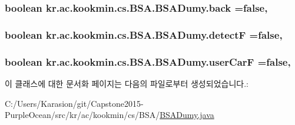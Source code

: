 \subsubsection[{back}]{\setlength{\rightskip}{0pt plus 5cm}boolean kr.\+ac.\+kookmin.\+cs.\+B\+S\+A.\+B\+S\+A\+Dumy.\+back =false\hspace{0.3cm}{\ttfamily [static]}, {\ttfamily [private]}}\label{classkr_1_1ac_1_1kookmin_1_1cs_1_1_b_s_a_1_1_b_s_a_dumy_a83dfdbc6e79d76f3fb82f19e88526aea}
\hypertarget{classkr_1_1ac_1_1kookmin_1_1cs_1_1_b_s_a_1_1_b_s_a_dumy_a96b15a50850eb2c92dbb11ee225ff1ef}{}
\subsubsection[{detect\+F}]{\setlength{\rightskip}{0pt plus 5cm}boolean kr.\+ac.\+kookmin.\+cs.\+B\+S\+A.\+B\+S\+A\+Dumy.\+detect\+F =false\hspace{0.3cm}{\ttfamily [static]}, {\ttfamily [private]}}\label{classkr_1_1ac_1_1kookmin_1_1cs_1_1_b_s_a_1_1_b_s_a_dumy_a96b15a50850eb2c92dbb11ee225ff1ef}
\hypertarget{classkr_1_1ac_1_1kookmin_1_1cs_1_1_b_s_a_1_1_b_s_a_dumy_a2c1c5de6eb79fb484fba63ca2a9791f5}{}
\subsubsection[{user\+Car\+F}]{\setlength{\rightskip}{0pt plus 5cm}boolean kr.\+ac.\+kookmin.\+cs.\+B\+S\+A.\+B\+S\+A\+Dumy.\+user\+Car\+F =false\hspace{0.3cm}{\ttfamily [static]}, {\ttfamily [private]}}\label{classkr_1_1ac_1_1kookmin_1_1cs_1_1_b_s_a_1_1_b_s_a_dumy_a2c1c5de6eb79fb484fba63ca2a9791f5}


이 클래스에 대한 문서화 페이지는 다음의 파일로부터 생성되었습니다.\+:\begin{DoxyCompactItemize}
\item 
C\+:/\+Users/\+Karasion/git/\+Capstone2015-\/\+Purple\+Ocean/src/kr/ac/kookmin/cs/\+B\+S\+A/\hyperlink{_b_s_a_dumy_8java}{B\+S\+A\+Dumy.\+java}\end{DoxyCompactItemize}
